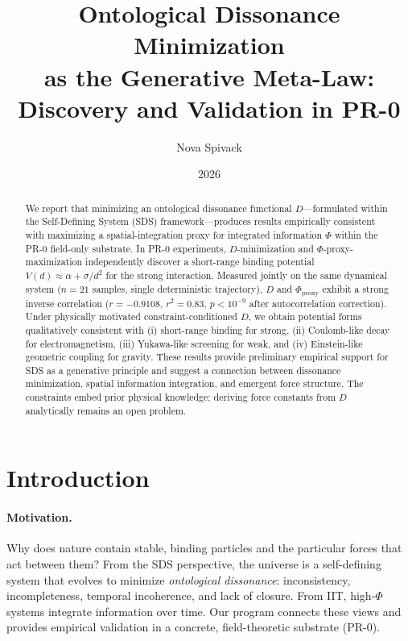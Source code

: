 \documentclass[12pt]{article}
\title{Ontological Dissonance Minimization\\as the Generative Meta-Law:\\Discovery and Validation in PR-0}
\author{Nova Spivack}
\date{2026}
\begin{document}
\maketitle
\NovaZenodoAfterTitle
\begin{abstract}
We report that minimizing an ontological dissonance functional $D$---formulated within the Self-Defining System (SDS) framework---produces results empirically consistent with maximizing a spatial-integration proxy for integrated information $\Phi$ within the PR-0 field-only substrate. In PR-0 experiments, $D$-minimization and $\Phi$-proxy-maximization independently discover a short-range binding potential $V(d)\approx \alpha + \sigma/d^2$ for the strong interaction. Measured jointly on the same dynamical system ($n=21$ samples, single deterministic trajectory), $D$ and $\Phi_{\mathrm{proxy}}$ exhibit a strong inverse correlation ($r=-0.9108$, $r^2=0.83$, $p<10^{-9}$ after autocorrelation correction). Under physically motivated constraint-conditioned $D$, we obtain potential forms qualitatively consistent with (i) short-range binding for strong, (ii) Coulomb-like decay for electromagnetism, (iii) Yukawa-like screening for weak, and (iv) Einstein-like geometric coupling for gravity. These results provide preliminary empirical support for SDS as a generative principle and suggest a connection between dissonance minimization, spatial information integration, and emergent force structure. The constraints embed prior physical knowledge; deriving force constants from $D$ analytically remains an open problem.
\end{abstract}

\tableofcontents

\section{Introduction}
\paragraph{Motivation.} Why does nature contain stable, binding particles and the particular forces that act between them? From the SDS perspective, the universe is a self-defining system that evolves to minimize \emph{ontological dissonance}: inconsistency, incompleteness, temporal incoherence, and lack of closure. From IIT, high-$\Phi$ systems integrate information over time. Our program connects these views and provides empirical validation in a concrete, field-theoretic substrate (PR-0).
\end{document}
